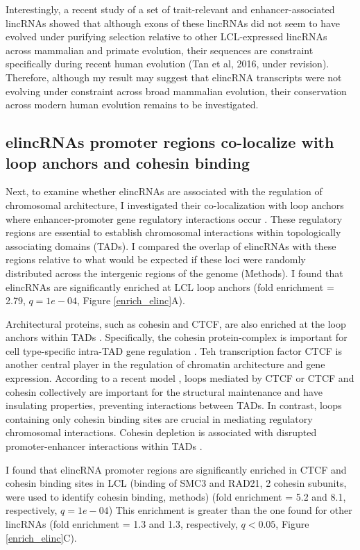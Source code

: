 \documentclass[11pt,a4paper]{report}
\begin{document}
Interestingly, a recent study of a set of trait-relevant and enhancer-associated lincRNAs showed that although exons of these lincRNAs did not seem to have evolved under purifying selection relative to other LCL-expressed lincRNAs across mammalian and primate evolution, their sequences are constraint specifically during recent human evolution (Tan et al, 2016, under revision). Therefore, although my result may suggest that elincRNA transcripts were not evolving under constraint across broad mammalian evolution, their conservation across modern human evolution remains to be investigated.

\subsection*{elincRNAs promoter regions co-localize with loop anchors and cohesin binding}

Next, to examine whether elincRNAs are associated with the regulation of chromosomal architecture, I investigated their co-localization with loop anchors where enhancer-promoter gene regulatory interactions occur \cite{Ji2016}. These regulatory regions are essential to establish chromosomal interactions within topologically associating domains (TADs). I compared the overlap of elincRNAs with these regions relative to what would be expected if these loci were randomly distributed across the intergenic regions of the genome (Methods). I found that elincRNAs are significantly enriched at LCL loop anchors (fold enrichment = 2.79, $q=1e-04$, Figure \ref{enrich_elinc}A).  

Architectural proteins, such as cohesin and CTCF, are also enriched at the loop anchors within TADs \cite{Rao2014}⁠. Specifically, the cohesin protein-complex is important for cell type-specific intra-TAD gene regulation \cite{Hadjur2009}⁠. Teh transcription factor CTCF is another central player in the regulation of chromatin architecture and gene expression. According to a recent model \cite{Ji2016}⁠, loops mediated by CTCF or CTCF and cohesin collectively are important for the structural maintenance and have insulating properties, preventing interactions between TADs. In contrast, loops containing only cohesin binding sites are crucial in mediating regulatory chromosomal interactions. Cohesin depletion is associated with disrupted promoter-enhancer interactions within TADs \cite{Seitan2013}⁠.

I found that elincRNA promoter regions are significantly enriched in CTCF and cohesin binding sites in LCL (binding of SMC3 and RAD21, 2 cohesin subunits, were used to identify cohesin binding, methods) (fold enrichment = 5.2 and 8.1, respectively, $q=1e-04$) This enrichment is greater than the one found for other lincRNAs (fold enrichment = 1.3 and 1.3, respectively, $q<0.05$, Figure \ref{enrich_elinc}C).
\end{document}
